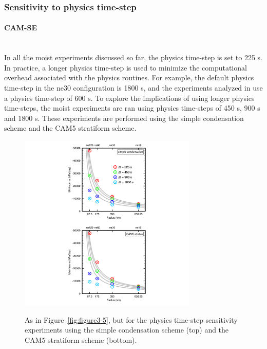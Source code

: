 \subsubsection{Sensitivity to physics time-step}
\paragraph{CAM-SE} ~\\
In all the moist experiments discussed so far, the physics time-step is set to 225 s. In practice, a longer physics time-step is used to minimize the computational overhead associated with the physics routines. For example, the default physics time-step in the ne30 configuration is 1800 s, and the experiments analyzed in \cite{HR2017JCLIM} use a physics time-step of 600 s. To explore the implications of using longer physics time-steps, the moist experiments are ran using physics time-steps of 450 s, 900 s and 1800 s. These experiments are performed using the simple condensation scheme and the CAM5 stratiform scheme.

\begin{figure}
\begin{center}
\noindent\includegraphics[width=20pc,angle=0]{chapter3/Figure6_crop.pdf}\\
\end{center}
\caption{As in Figure~\ref{fig:figure3-5}, but for the physics time-step sensitivity experiments using the simple condensation scheme (top) and the CAM5 stratiform scheme (bottom).}
\label{fig:figure3-6}
\end{figure}

